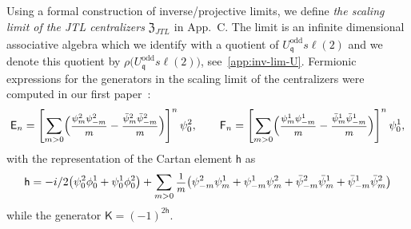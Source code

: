 \documentclass[11pt]{article}
\newcommand{\q}{\mathfrak{q}}
\newcommand{\ffrac}[2]{\mbox{\footnotesize$\displaystyle\frac{#1}{#2}$}}
\newcommand{\JTL}[1]{JTL_{#1}}
\newcommand{\LQGodd}{U^{\text{odd}}_{\q} s\ell(2)}
\newcommand{\K}{\mathsf{K}}
\newcommand{\F}{\mathsf{F}}
\newcommand{\FF}[1]{\F_{#1}}
\newcommand{\E}{\mathsf{E}}
\newcommand{\EE}[1]{\E_{#1}}
\newcommand{\h}{\mathsf{h}}
\newcommand{\sfermp}{\psi^{2}}
\newcommand{\sfermm}{\psi^{1}}
\newcommand{\bsfermp}{\bar{\psi}^{2}}
\newcommand{\bsfermm}{\bar{\psi}^{1}}
\newcommand{\phip}{\phi^{2}}
\newcommand{\phim}{\phi^{1}}
\newcommand{\interLie}{\mathfrak{S}}
\newcommand{\interinfin}{\interLie_{\infty}}
\newcommand{\cent}{\mathfrak{Z}}
\newcommand{\centJTL}{\cent_{\JTL{}}}
\newcommand{\AppLim}{C}
\theoremstyle{definition}
\begin{document}
Using a formal construction of  inverse/projective limits, we define  \textit{the scaling limit of the JTL centralizers} $\centJTL$ in App.~\AppLim. The limit is an infinite dimensional associative algebra which we identify with a quotient of $\LQGodd$ and we denote this quotient by $\rho\bigl(\LQGodd\bigr)$, see~\eqref{app:inv-lim-U}.
Fermionic expressions for the generators in the scaling limit of the centralizers were  computed in our first paper~\cite{GRS1}:
\begin{equation}\label{scal-lim-LQGodd}
  \EE n =
\left[\sum_{m>0}
\Bigl(\ffrac{\sfermp_{m}\sfermp_{-m}}{m} -
\ffrac{\bsfermp_{m}\bsfermp_{-m}}{m}\Bigr)\right]^n\psi_0^2,\qquad
\FF n =
\left[\sum_{m>0}
\Bigl(\ffrac{\sfermm_{m}\sfermm_{-m}}{m} -
\ffrac{\bsfermm_{m}\bsfermm_{-m}}{m}\Bigr)\right]^n\psi_0^1,
\end{equation}
%
with the representation of the Cartan element $\h$ as
\begin{equation}\label{scal-lim-h}
\h =- i/2 \bigl(\sfermp_0\phim_0 + \sfermm_0\phip_0\bigr) + \sum_{m>0}
\ffrac{1}{m}\bigl(\sfermp_{-m}\sfermm_{m} + \sfermm_{-m}\sfermp_{m} + \bsfermp_{-m}\bsfermm_{m} + \bsfermm_{-m}\bsfermp_{m}\bigr)
\end{equation}
while the generator $\K = (-1)^{2\h}$.
\end{document}
